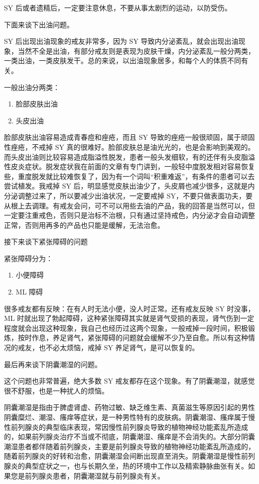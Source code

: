 \documentclass[fontset=founder]{ctexart}
\begin{document}
SY 后或者遗精后，一定要注意休息，不要从事太剧烈的运动，以防受伤。

下面来谈下出油问题。

SY 后出现出油现象的戒友非常多，因为 SY 导致内分泌紊乱，就会出现出油现象，当然不全是出油，有部分戒友则是表现为皮肤干燥，内分泌紊乱一般分两类，一类出油，一类皮肤发干。总的来说，以出油现象居多，和每个人的体质不同有关。

一般出油分两类：

\begin{enumerate}
    \item 脸部皮肤出油
    \item 头皮出油
\end{enumerate}

脸部皮肤出油容易造成青春痘和痤疮，而且 SY 导致的痤疮一般很顽固，属于顽固性痤疮，不戒掉 SY 真的很难好。脸部皮肤总是油光光的，也是会影响到美观的。而头皮出油则比较容易造成脂溢性脱发，患者一般头发细软，有的还伴有头皮脂溢性皮炎症状。脱发症状我在前面的文章有专门讲到，一般轻中度脱发相对容易恢复些，重度脱发就比较难恢复了，因为有一个词叫“积重难返”，有条件的患者可以去尝试植发。我戒掉 SY 后，明显感觉皮肤出油少了，头皮屑也减少很多，这就是内分泌调整过来了，所以要减少出油状况，一定要戒掉 SY，不要只做表面功夫，要从根上去调理。有戒友会问，可不可以用些去油的产品，我的回答是当然可以，但一定要注重戒色，否则只是治标不治根，只有通过坚持戒色，内分泌才会自动调整正常，否则用再多的产品也只能是缓解，无法治愈。

接下来谈下紧张障碍的问题

紧张障碍分为：

\begin{enumerate}
    \item 小便障碍
    \item ML 障碍
\end{enumerate}

很多戒友都有反映：在有人时无法小便，没人时正常。还有戒友反映 SY 时没事，ML 时就出现了勃起障碍，这种紧张障碍其实就是肾气受损的表现，肾气伤到一定程度就会出现这种现象，我自己也经历过这两个现象，一般戒掉一段时间，积极锻炼，按时作息，养足肾气，紧张障碍的问题就会缓解不少乃至自愈。所以有这种情况的戒友，也不必太烦恼，戒掉 SY 养足肾气，是可以恢复的。

最后再来谈下阴囊潮湿的问题。

这个问题也非常普遍，绝大多数 SY 戒友都存在这个现象。有了阴囊潮湿，就感觉很不舒服，也是一种扰人的烦恼。

阴囊潮湿是指由于脾虚肾虚、药物过敏、缺乏维生素、真菌滋生等原因引起的男性阴囊糜烂、潮湿、瘙痒等症状，是一种男性特有的皮肤病。阴囊潮湿、瘙痒属于慢性前列腺炎的典型临床表现，常因慢性前列腺炎导致的植物神经功能紊乱所造成的，如果前列腺炎治疗不当或不彻底，阴囊潮湿、瘙痒是不会消失的。大部分阴囊潮湿患者都伴随着前列腺炎，主要是前列腺炎导致的植物神经功能紊乱所造成的，随着前列腺炎的好转和治愈，阴囊潮湿会间断出现直至消失。阴囊潮湿是慢性前列腺炎的典型症状之一，也与长期久坐，热的环境中工作以及精索静脉曲张有关。如果您是前列腺炎患者，阴囊潮湿就与前列腺炎有关。
\end{document}

